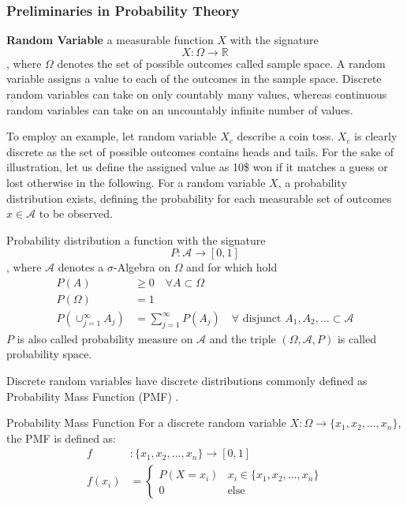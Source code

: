 \subsubsection{Preliminaries in Probability Theory}
\begin{definition}{\textbf{Random Variable}} a measurable function $X$ with the signature
\begin{equation}
X : \Omega \rightarrow \mathbb{R}
\end{equation}
, where $\Omega$ denotes the set of possible outcomes called sample space. A random variable assigns a value to each of the outcomes in the sample space. Discrete random variables can take on only countably many values, whereas continuous random variables can take on an uncountably infinite number of values. 
\end{definition}
To employ an example, let random variable $X_c$ describe a coin toss. $X_c$ is clearly discrete as the set of possible outcomes contains heads and tails. For the sake of illustration, let us define the assigned value as 10\$ won if it matches a guess or lost otherwise in the following.
For a random variable $X$, a probability distribution exists, defining the probability for each measurable set of outcomes $x \in \mathcal{A}$ to be observed.
\begin{definition}{Probability distribution} a function with the signature
\begin{equation}
P : \mathcal{A} \rightarrow [0,1]
\end{equation}
, where $\mathcal{A}$ denotes a $\sigma$-Algebra on $\Omega$ and for which hold
\begin{align}
P(A) &\geq 0 \quad \forall A \subset \Omega \\
P(\Omega) &= 1 \\
P(\cup_{j=1}^{\infty} A_j) &= \sum_{j=1}^{\infty} P(A_j) \quad \forall \text{ disjunct } A_1, A_2,... \subset \mathcal{A}
\end{align}
$P$ is also called probability measure on $\mathcal{A}$ and the triple $(\Omega, \mathcal{A}, P)$ is called probability space.
\end{definition}
Discrete random variables have discrete distributions commonly defined as Probability Mass Function (PMF) \cite{DBLP:phd/dnb/Kling16}.
\begin{definition}{Probability Mass Function} For a discrete random variable $X : \Omega \rightarrow \{x_1, x_2,..., x_n\}$, the PMF is defined as:
\begin{align}
f &: \{x_1, x_2,...,x_n\} \rightarrow [0,1] \\
f(x_i) &= \begin{cases} 
      P(X=x_i) & x_i \in \{x_1, x_2,..., x_n\} \\
      0 & \text{else}
   \end{cases}
\end{align}
\end{definition}
